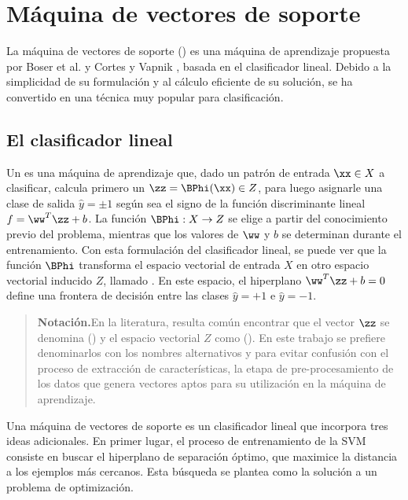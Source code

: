 %
%
%
\section{Máquina de vectores de soporte}
%
La máquina de vectores de soporte ()
es una máquina de aprendizaje propuesta por Boser et al. \cite{boser}
y Cortes y Vapnik \cite{svm}, basada en el clasificador lineal.
Debido a la simplicidad de su formulación y al cálculo eficiente de su
solución, se ha convertido en una técnica muy popular para
clasificación.
%
%
\subsection{El clasificador lineal}
%
Un  \cite{nilsson} es una máquina de
aprendizaje que, dado un patrón de entrada $\xx\in{}X$ a clasificar,
calcula primero un  $\zz=\BPhi(\xx)\in{}Z$, para
luego asignarle una clase de salida $\hat{y}=\pm{}1$ según sea el
signo de la función discriminante lineal $f=\ww^T\zz+b$. La función
$\BPhi:X\rightarrow{}Z$ se elige a partir del conocimiento previo del
problema, mientras que los valores de $\ww$ y $b$ se determinan
durante el entrenamiento. Con esta formulación del clasificador
lineal, se puede ver que la función $\BPhi$ transforma el espacio
vectorial de entrada $X$ en otro espacio vectorial inducido $Z$,
llamado . En este espacio, el hiperplano
$\ww^T\zz+b=0$ define una frontera de decisión entre las clases
$\hat{y}=+1$ e $\hat{y}=-1$.
%
\begin{quote}
  {\bfseries Notación.}\quad{}En la literatura, resulta común
  encontrar que el vector $\zz$ se denomina  () y el espacio vectorial $Z$
  como  ().  En
  este trabajo se prefiere denominarlos con los nombres alternativos
   y  para evitar
  confusión con el proceso de extracción de características, la etapa
  de pre-procesamiento de los datos que genera vectores aptos para su
  utilización en la máquina de aprendizaje.
\end{quote}
%

Una máquina de vectores de soporte es un clasificador lineal que
incorpora tres ideas adicionales. En primer lugar, el proceso de
entrenamiento de la SVM consiste en buscar el hiperplano de separación
óptimo, que maximice la distancia a los ejemplos más cercanos. Esta
búsqueda se plantea como la solución a un problema de optimización.

